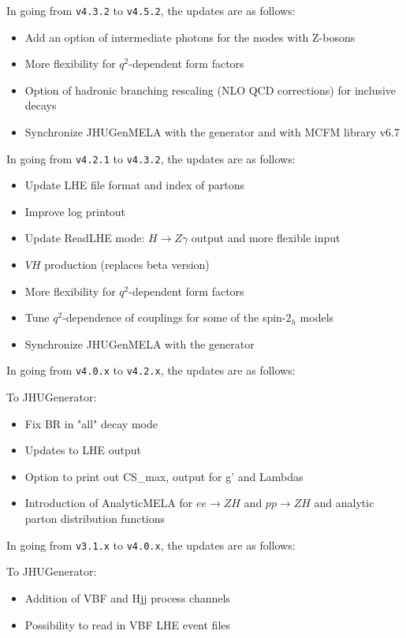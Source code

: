\documentclass[aps,superscriptaddress,nofootinbib]{revtex4}
\begin{document}
\noindent
In going from \verb|v4.3.2| to \verb|v4.5.2|, the updates are as follows:

\begin{itemize}
\item Add an option of intermediate photons for the modes with Z-bosons
\item More flexibility for $q^2$-dependent form factors
\item Option of hadronic branching rescaling (NLO QCD corrections) for inclusive decays
\item Synchronize JHUGenMELA with the generator and with MCFM library v6.7
\end{itemize}

\noindent
In going from \verb|v4.2.1| to \verb|v4.3.2|, the updates are as follows:

\begin{itemize}
\item Update LHE file format and index of partons
\item Improve log printout
\item Update ReadLHE mode: $H\to Z\gamma$ output and more flexible input
\item $VH$ production (replaces beta version)
\item More flexibility for $q^2$-dependent form factors
\item Tune $q^2$-dependence of couplings for some of the spin-$2_h$ models
\item Synchronize JHUGenMELA with the generator
\end{itemize}

\noindent
In going from \verb|v4.0.x| to \verb|v4.2.x|, the updates are as follows:

To JHUGenerator:
\begin{itemize}
\item Fix BR in "all" decay mode
\item Updates to LHE output
\item Option to print out CS\_max, output for g' and Lambdas
\item Introduction of AnalyticMELA for $ee \to ZH$ and $pp \to ZH$ and analytic parton distribution functions
\end{itemize}


\noindent
In going from \verb|v3.1.x| to \verb|v4.0.x|, the updates are as follows:

To JHUGenerator:
\begin{itemize}
\item Addition of VBF and Hjj process channels
\item Possibility to read in VBF LHE event files
\end{itemize}
\end{document}
